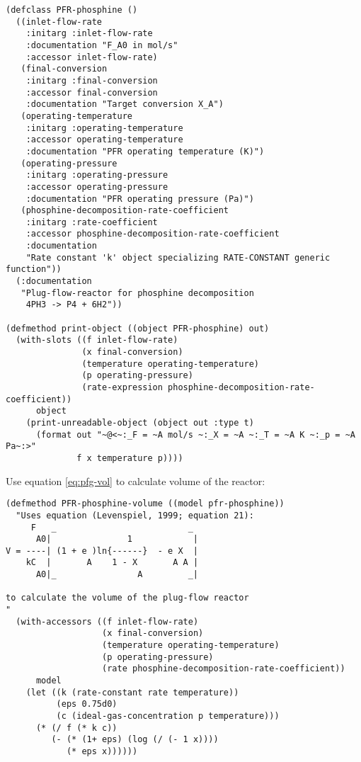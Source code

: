 \documentclass[listings, a4paper, fleqn, pdftex, 12pt, openany, oneside, final]{memoir}
\theoremstyle{definition}
\begin{document}
\begin{verbatim}
(defclass PFR-phosphine ()
  ((inlet-flow-rate
    :initarg :inlet-flow-rate
    :documentation "F_A0 in mol/s"
    :accessor inlet-flow-rate)
   (final-conversion
    :initarg :final-conversion
    :accessor final-conversion
    :documentation "Target conversion X_A")
   (operating-temperature
    :initarg :operating-temperature
    :accessor operating-temperature
    :documentation "PFR operating temperature (K)")
   (operating-pressure
    :initarg :operating-pressure
    :accessor operating-pressure
    :documentation "PFR operating pressure (Pa)")
   (phosphine-decomposition-rate-coefficient
    :initarg :rate-coefficient
    :accessor phosphine-decomposition-rate-coefficient
    :documentation
    "Rate constant 'k' object specializing RATE-CONSTANT generic function"))
  (:documentation
   "Plug-flow-reactor for phosphine decomposition
    4PH3 -> P4 + 6H2"))

(defmethod print-object ((object PFR-phosphine) out)
  (with-slots ((f inlet-flow-rate)
               (x final-conversion)
               (temperature operating-temperature)
               (p operating-pressure)
               (rate-expression phosphine-decomposition-rate-coefficient))
      object
    (print-unreadable-object (object out :type t)
      (format out "~@<~:_F = ~A mol/s ~:_X = ~A ~:_T = ~A K ~:_p = ~A Pa~:>"
              f x temperature p))))
\end{verbatim}

Use equation \eqref{eq:pfg-vol} to calculate volume of the reactor:

\begin{verbatim}
(defmethod PFR-phosphine-volume ((model pfr-phosphine))
  "Uses equation (Levenspiel, 1999; equation 21):
     F   _                          _  
      A0|               1            | 
V = ----| (1 + e )ln{------}  - e X  | 
    kC  |       A    1 - X       A A | 
      A0|_                A         _| 

to calculate the volume of the plug-flow reactor
"
  (with-accessors ((f inlet-flow-rate)
                   (x final-conversion)
                   (temperature operating-temperature)
                   (p operating-pressure)
                   (rate phosphine-decomposition-rate-coefficient))
      model
    (let ((k (rate-constant rate temperature))
          (eps 0.75d0)
          (c (ideal-gas-concentration p temperature)))
      (* (/ f (* k c))
         (- (* (1+ eps) (log (/ (- 1 x))))
            (* eps x))))))
\end{verbatim}
\end{document}

